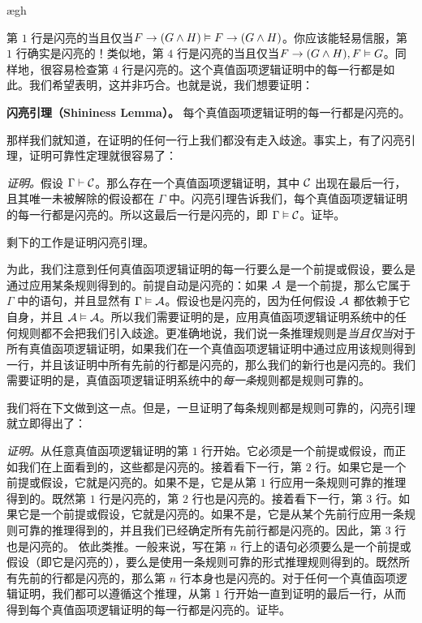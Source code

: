 \begin{fitchproof}
		\PR
		\open
			\AS
			\ae{gh}
		\close
	\end{fitchproof}

\noindent\noindent
第 $1$ 行是闪亮的当且仅当$F \rightarrow (G \wedge H) \vDash F \rightarrow (G \wedge H)$。你应该能轻易信服，第 $1$ 行确实是闪亮的！类似地，第 $4$ 行是闪亮的当且仅当$F \rightarrow (G \wedge H), F \vDash G$。同样地，很容易检查第 $4$ 行是闪亮的。这个真值函项逻辑证明中的每一行都是如此。我们希望表明，这并非巧合。也就是说，我们想要证明：


\begin{factoidboxe}\textbf{闪亮引理（Shininess Lemma）。}
		每个真值函项逻辑证明的每一行都是闪亮的。
	\end{factoidboxe}

\noindent
那样我们就知道，在证明的任何一行上我们都没有走入歧途。事实上，有了闪亮引理，证明可靠性定理就很容易了：

\emph{证明。}假设 $\Gamma \vdash \mathcal{C}$。那么存在一个真值函项逻辑证明，其中 $\mathcal{C}$ 出现在最后一行，且其唯一未被解除的假设都在 $\Gamma$ 中。闪亮引理告诉我们，每个真值函项逻辑证明的每一行都是闪亮的。所以这最后一行是闪亮的，即 $\Gamma \vDash \mathcal{C}$。证毕。

剩下的工作是证明闪亮引理。

为此，我们注意到任何真值函项逻辑证明的每一行要么是一个前提或假设，要么是通过应用某条规则得到的。前提自动是闪亮的：如果 $\mathcal{A}$ 是一个前提，那么它属于 $\Gamma$ 中的语句，并且显然有 $\Gamma \vDash \mathcal{A}$。假设也是闪亮的，因为任何假设 $\mathcal{A}$ 都依赖于它自身，并且 $\mathcal{A} \vDash \mathcal{A}$。所以我们需要证明的是，应用真值函项逻辑证明系统中的任何规则都不会把我们引入歧途。更准确地说，我们说一条推理规则是\emph{当且仅当}对于所有真值函项逻辑证明，如果我们在一个真值函项逻辑证明中通过应用该规则得到一行，并且该证明中所有先前的行都是闪亮的，那么我们的新行也是闪亮的。我们需要证明的是，真值函项逻辑证明系统中的\emph{每一条}规则都是规则可靠的。

我们将在下文做到这一点。但是，一旦证明了每条规则都是规则可靠的，闪亮引理就立即得出了：

\emph{证明。}从任意真值函项逻辑证明的第 $1$ 行开始。它必须是一个前提或假设，而正如我们在上面看到的，这些都是闪亮的。接着看下一行，第 $2$ 行。如果它是一个前提或假设，它就是闪亮的。如果不是，它是从第 $1$ 行应用一条规则可靠的推理得到的。既然第 $1$ 行是闪亮的，第 $2$ 行也是闪亮的。接着看下一行，第 $3$ 行。如果它是一个前提或假设，它就是闪亮的。如果不是，它是从某个先前行应用一条规则可靠的推理得到的，并且我们已经确定所有先前行都是闪亮的。因此，第 $3$ 行也是闪亮的。
依此类推。一般来说，写在第 $n$ 行上的语句必须要么是一个前提或假设（即它是闪亮的），要么是使用一条规则可靠的形式推理规则得到的。既然所有先前的行都是闪亮的，那么第 $n$ 行本身也是闪亮的。对于任何一个真值函项逻辑证明，我们都可以遵循这个推理，从第 $1$ 行开始一直到证明的最后一行，从而得到每个真值函项逻辑证明的每一行都是闪亮的。证毕。

